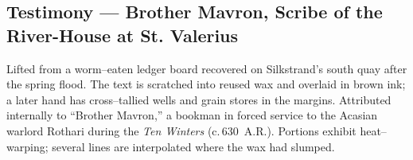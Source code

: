 \documentclass[11pt]{article}
\begin{document}
\clearpage

\subsection{Testimony — Brother Mavron, Scribe of the River-House at St. Valerius}
\label{ms:mavron-testimony}

\begin{tcolorbox}[enhanced,breakable,
  colback=royal!3, colframe=royal!70!black, boxrule=0.6pt,
  left=6pt, right=6pt, top=6pt, bottom=6pt,
  title={Provenance}]
\label{prov:mavron}
\small
Lifted from a worm–eaten ledger board recovered on Silkstrand’s south quay after the spring flood. 
The text is scratched into reused wax and overlaid in brown ink; a later hand has cross–tallied wells and grain stores in the margins. 
Attributed internally to “Brother Mavron,” a bookman in forced service to the Acasian warlord Rothari during the \emph{Ten Winters} (c.\,630~A.R.). 
Portions exhibit heat–warping; several lines are interpolated where the wax had slumped.
\end{tcolorbox}
\end{document}

